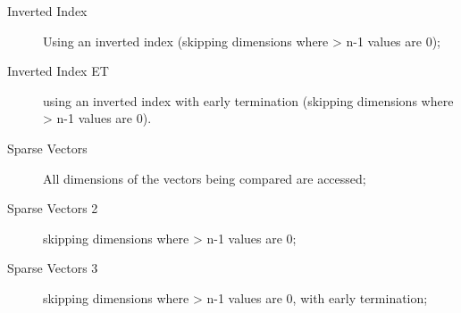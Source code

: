 \begin{singlespace*} 
\begin{description}\item[Inverted Index] Using an inverted index (skipping dimensions where > n-1 values are 0);
\item[Inverted Index ET] using an inverted index with early termination (skipping dimensions where > n-1 values are 0).
\item[Sparse Vectors] All dimensions of the vectors being compared are accessed;
\item[Sparse Vectors 2] skipping dimensions where > n-1 values are 0;
\item[Sparse Vectors 3] skipping dimensions where > n-1 values are 0, with early termination;
\end{description}
\end{singlespace*}
